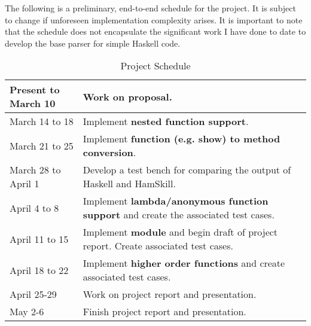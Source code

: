\documentclass{report}
\begin{document}
The following is a preliminary, end-to-end schedule for the project.  It is subject to change if unforeseen implementation complexity arises.  It is important to note that the schedule does not encapsulate the significant work I have done to date to develop the base parser for simple Haskell code.

\begin{table}[h]

\begin{center}
  \begin{tabular}{ | >{\centering\arraybackslash}m{1in} || m{3in} | }
    \hline
    Present to March 10 & Work on proposal. \\ \hline
    March 14 to 18 & Implement \textbf{nested function support}. \\ \hline
    March 21 to 25 & Implement \textbf{function (e.g. show) to method conversion}. \\ \hline
    March 28 to April 1 & Develop a test bench for comparing the output of Haskell and HamSkill. \\ \hline
    April 4 to 8 & Implement \textbf{lambda/anonymous function support} and create the associated test cases. \\ \hline
    April 11 to 15 & Implement \textbf{module} and begin draft of project report.  Create associated test cases. \\ \hline
    April 18 to 22 & Implement \textbf{higher order functions} and create associated test cases. \\ \hline
    April 25-29 & Work on project report and presentation.  \\ \hline
    May 2-6 & Finish project report and presentation.  \\ \hline
  \end{tabular}
\end{center}
\caption{Project Schedule}\label{tab:projectSchedule}
\end{table}

\pagebreak


\end{document}
